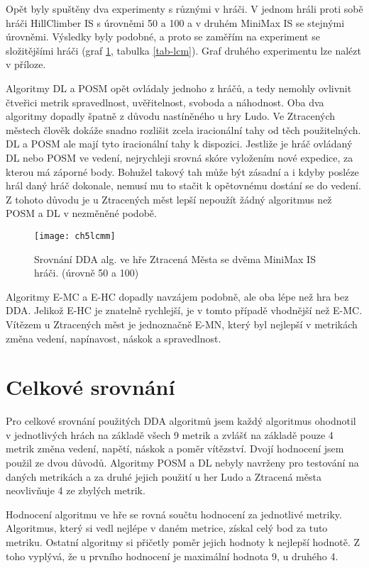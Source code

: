 Opět byly spuštěny dva experimenty s různými v hráči. V jednom hráli proti sobě hráči HillClimber IS s úrovněmi 50 a 100 a v druhém MiniMax IS se stejnými úrovněmi. Výsledky byly podobné, a proto se zaměřím na experiment se složitějšími hráči (graf \ref{fig-ch5lcmm}, tabulka \ref{tab-lcm}). Graf druhého experimentu lze nalézt v příloze.

Algoritmy DL a POSM opět ovládaly jednoho z hráčů, a tedy nemohly ovlivnit čtveřici metrik spravedlnost, uvěřitelnost, svoboda a náhodnost. Oba dva algoritmy dopadly špatně z důvodu nastíněného u hry Ludo. Ve Ztracených městech člověk dokáže snadno rozlišit zcela iracionální tahy od těch použitelných. DL a POSM ale mají tyto iracionální tahy k dispozici. Jestliže je hráč ovládaný DL nebo POSM ve vedení, nejrychleji srovná skóre vyložením nové expedice, za kterou má záporné body. Bohužel takový tah může být zásadní a i kdyby posléze hrál daný hráč dokonale, nemusí mu to stačit k opětovnému dostání se do vedení. Z tohoto důvodu je u Ztracených měst lepší nepoužít žádný algoritmus než POSM a DL v nezměněné podobě.

\begin{figure}
  \centering
  \texttt{[image: ch5lcmm]}
	\caption{Srovnání DDA alg. ve hře Ztracená Města se dvěma MiniMax IS hráči. (úrovně 50 a 100)}
	\label{fig-ch5lcmm}
\end{figure}

Algoritmy E-MC a E-HC dopadly navzájem podobně, ale oba lépe než hra bez DDA. Jelikož E-HC je znatelně rychlejší, je v tomto případě vhodnější než E-MC. Vítězem u Ztracených měst je jednoznačně E-MN, který byl nejlepší v metrikách změna vedení, napínavost, náskok a spravedlnost.

\section{Celkové srovnání}

Pro celkové srovnání použitých DDA algoritmů jsem každý algoritmus ohodnotil v jednotlivých hrách na základě všech 9 metrik a zvlášť na základě pouze 4 metrik změna vedení, napětí, náskok a poměr vítězství. Dvojí hodnocení jsem použil ze dvou důvodů. Algoritmy POSM a DL nebyly navrženy pro testování na daných metrikách a za druhé jejich použití u her Ludo a Ztracená města neovlivňuje 4 ze zbylých metrik.

Hodnocení algoritmu ve hře se rovná součtu hodnocení za jednotlivé metriky. Algoritmus, který si vedl nejlépe v daném metrice, získal celý bod za tuto metriku. Ostatní algoritmy si přičetly poměr jejich hodnoty k nejlepší hodnotě. Z toho vyplývá, že u prvního hodnocení je maximální hodnota 9, u druhého 4.

